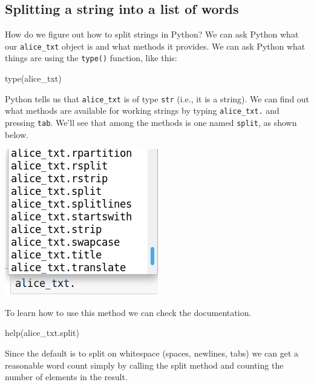\documentclass[]{book}
\newenvironment{Shaded}{\begin{snugshade}}{\end{snugshade}}
\newcommand{\BuiltInTok}[1]{#1}
\newcommand{\NormalTok}[1]{#1}
\begin{document}
\hypertarget{splitting-a-string-into-a-list-of-words}{%
\subsection{Splitting a string into a list of words}\label{splitting-a-string-into-a-list-of-words}}

How do we figure out how to split strings in Python? We can ask Python what our \texttt{alice\_txt} object is and what methods it provides. We can ask Python what things are using the \texttt{type()} function, like this:

\begin{Shaded}
\begin{Highlighting}[]
\BuiltInTok{type}\NormalTok{(alice_txt)}
\end{Highlighting}
\end{Shaded}

Python tells us that \texttt{alice\_txt} is of type \texttt{str} (i.e., it is a string). We can find out what methods are available for working strings by typing \texttt{alice\_txt.} and pressing \texttt{tab}. We'll see that among the methods is one named \texttt{split}, as shown below.

\includegraphics{Python/PythonIntro/images/notebook_string_completion.png}

To learn how to use this method we can check the documentation.

\begin{Shaded}
\begin{Highlighting}[]
\BuiltInTok{help}\NormalTok{(alice_txt.split)}
\end{Highlighting}
\end{Shaded}

Since the default is to split on whitespace (spaces, newlines, tabs) we can get a reasonable word count simply by calling the split method and counting the number of elements in the result.
\end{document}
